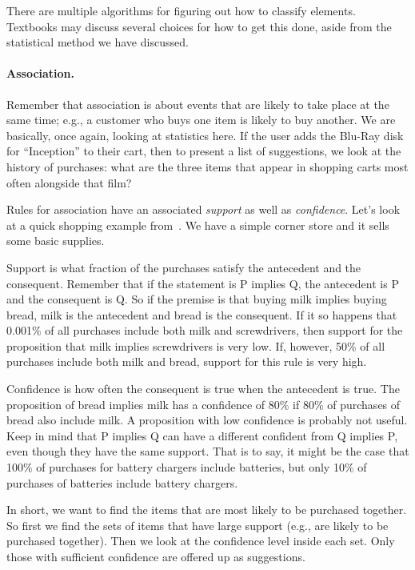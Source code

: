 There are multiple algorithms for figuring out how to classify elements. Textbooks may discuss several choices for how to get this done, aside from the statistical method we have discussed. 



\paragraph{Association.} Remember that association is about events that are likely to take place at the same time; e.g., a customer who buys one item is likely to buy another. We are basically, once again, looking at statistics here. If the user adds the Blu-Ray disk for ``Inception'' to their cart, then to present a list of suggestions, we look at the history of purchases: what are the three items that appear in shopping carts most often alongside that film?

Rules for association have an associated \textit{support} as well as \textit{confidence}. Let's look at a quick shopping example from~\cite{dsc}. We have a simple corner store and it sells some basic supplies.

Support is what fraction of the purchases satisfy the antecedent and the consequent. Remember that if the statement is P implies Q, the antecedent is P and the consequent is Q. So if the premise is that buying milk implies buying bread, milk is the antecedent and bread is the consequent. If it so happens that 0.001\% of all purchases include both milk and screwdrivers, then support for the proposition that milk implies screwdrivers is very low. If, however, 50\% of all purchases include both milk and bread, support for this rule is very high.

Confidence is how often the consequent is true when the antecedent is true. The proposition of bread implies milk has a confidence of 80\% if 80\% of purchases of bread also include milk. A proposition with low confidence is probably not useful. Keep in mind that P implies Q can have a different confident from Q implies P, even though they have the same support. That is to say, it might be the case that 100\% of purchases for battery chargers include batteries, but only 10\% of purchases of batteries include battery chargers.

In short, we want to find the items that are most likely to be purchased together. So first we find the sets of items that have large support (e.g., are likely to be purchased together). Then we look at the confidence level inside each set. Only those with sufficient confidence are offered up as suggestions. 


